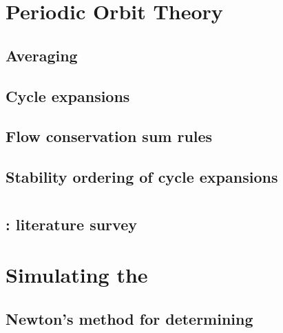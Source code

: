 \chapter{Periodic Orbit Theory}
\label{chap:POT}
    \section{Averaging}
	

    \section{Cycle expansions}
        \label{sec:cycExp}
        

    \section{Flow conservation sum rules}
        \label{s-Cons-m-flow}
        

    \section{Stability ordering of cycle expansions}
        \label{s-StabOrd}
         



\chapter{\KSe}
\label{chap:KSe}

    \section{\KS: literature survey}
        \label{sec:KSlit}
        



\chapter{Simulating the \KSe}
\label{chap:Numerics}
    \section{Newton's method for determining \reqva}
        


